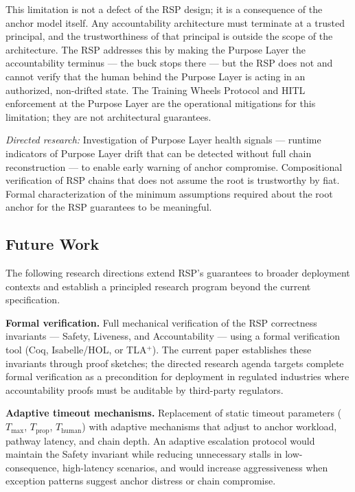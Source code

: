 This limitation is not a defect of the RSP design; it is a consequence of the anchor model itself. Any accountability architecture must terminate at a trusted principal, and the trustworthiness of that principal is outside the scope of the architecture. The RSP addresses this by making the Purpose Layer the accountability terminus — the buck stops there — but the RSP does not and cannot verify that the human behind the Purpose Layer is acting in an authorized, non-drifted state. The Training Wheels Protocol and HITL enforcement at the Purpose Layer are the operational mitigations for this limitation; they are not architectural guarantees.

\textit{Directed research:} Investigation of Purpose Layer health signals — runtime indicators of Purpose Layer drift that can be detected without full chain reconstruction — to enable early warning of anchor compromise. Compositional verification of RSP chains that does not assume the root is trustworthy by fiat. Formal characterization of the minimum assumptions required about the root anchor for the RSP guarantees to be meaningful.

\subsection{Future Work}
\label{sec:future-work}

The following research directions extend RSP's guarantees to broader deployment contexts and establish a principled research program beyond the current specification.

\medskip
\noindent\textbf{Formal verification.} Full mechanical verification of the RSP correctness invariants — Safety, Liveness, and Accountability — using a formal verification tool (Coq, Isabelle/HOL, or TLA$^+$). The current paper establishes these invariants through proof sketches; the directed research agenda targets complete formal verification as a precondition for deployment in regulated industries where accountability proofs must be auditable by third-party regulators.

\medskip
\noindent\textbf{Adaptive timeout mechanisms.} Replacement of static timeout parameters ($T_{\max}$, $T_{\text{prop}}$, $T_{\text{human}}$) with adaptive mechanisms that adjust to anchor workload, pathway latency, and chain depth. An adaptive escalation protocol would maintain the Safety invariant while reducing unnecessary stalls in low-consequence, high-latency scenarios, and would increase aggressiveness when exception patterns suggest anchor distress or chain compromise.

